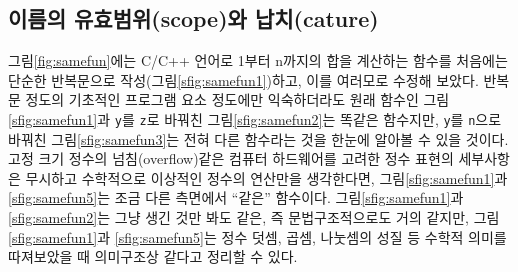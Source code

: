 \subsection{이름의 유효범위(scope)와 납치(cature)}
그림\;\ref{fig:samefun}에는 C/C++ 언어로 1부터 n까지의 합을 계산하는 함수를
처음에는 단순한 반복문으로 작성(그림\;\ref{sfig:samefun1})하고, 이를 여러모로
수정해 보았다. 반복문 정도의 기초적인 프로그램 요소 정도에만 익숙하더라도
원래 함수인 그림\;\ref{sfig:samefun1}과 \texttt{y}를 \texttt{z}로 바꿔친
그림\;\ref{sfig:samefun2}는 똑같은 함수지만, \texttt{y}를 \texttt{n}으로
바꿔친 그림\;\ref{sfig:samefun3}는 전혀 다른 함수라는 것을 한눈에 알아볼 수
있을 것이다. 고정 크기 정수의 넘침(overflow)같은 컴퓨터 하드웨어를 고려한 
정수 표현의 세부사항은 무시하고 수학적으로 이상적인 정수의 연산만을 생각한다면,
그림\;\ref{sfig:samefun1}과 \ref{sfig:samefun5}는 조금 다른 측면에서
``같은'' 함수이다. 그림\;\ref{sfig:samefun1}과 \ref{sfig:samefun2}는
그냥 생긴 것만 봐도 같은, 즉 문법구조적으로도 거의 같지만,
그림\;\ref{sfig:samefun1}과 \ref{sfig:samefun5}는 정수 덧셈, 곱셈, 나눗셈의
성질 등 수학적 의미를 따져보았을 때 의미구조상 같다고 정리할 수 있다.


